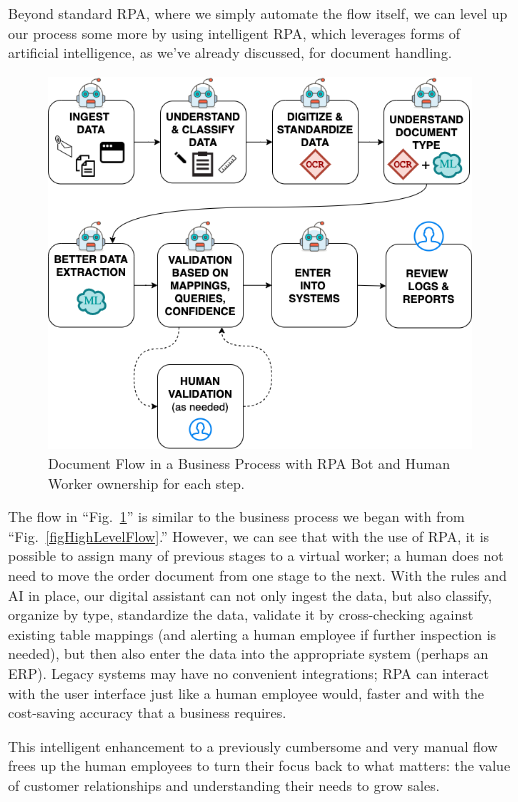 \documentclass[conference]{IEEEtran}
\begin{document}
Beyond standard RPA, where we simply automate the flow itself, we can level up our process some more by using intelligent RPA, which leverages forms of artificial intelligence, as we've already discussed, for document handling.

\begin{figure}[ht]
\centerline{\includegraphics[width=\columnwidth]{BotFlow.png}}
\caption{Document Flow in a Business Process with RPA Bot and Human Worker ownership for each step.}
\label{figBotFlow}
\end{figure}

The flow in ``Fig.~\ref{figBotFlow}'' is similar to the business process we began with from ``Fig.~\ref{figHighLevelFlow}.'' However, we can see that with the use of RPA, it is possible to assign many of previous stages to a virtual worker; a human does not need to move the order document from one stage to the next. With the rules and AI in place, our digital assistant can not only ingest the data, but also classify, organize by type, standardize the data, validate it by cross-checking against existing table mappings (and alerting a human employee if further inspection is needed), but then also enter the data into the appropriate system (perhaps an ERP). Legacy systems may have no convenient integrations; RPA can interact with the user interface just like a human employee would, faster and with the cost-saving accuracy that a business requires.

This intelligent enhancement to a previously cumbersome and very manual flow frees up the human employees to turn their focus back to what matters: the value of customer relationships and understanding their needs to grow sales.
\end{document}

